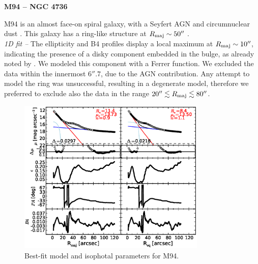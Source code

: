 \documentclass[preprint2]{emulateapj}
\newcommand{\fitfigurewidth}{0.8\textwidth}
\begin{document}
  \clearpage\newpage\noindent
  {\bf M94 -- NGC 4736 \\}

  M94 is an almost face-on spiral galaxy, with a Seyfert AGN \citep{veroncettyveron2006} and 
  circumnuclear dust \citep{elmegreen2002m94,peeplesmartini2006m94}.
  This galaxy has a ring-like structure at $R_{\rm maj} \sim 50''$ \citep{munoztunon1989m94}.\\

  \emph{1D fit -- }
  The ellipticity and B4 profiles display a local maximum at $R_{\rm maj} \sim 10''$, 
  indicating the presence of a disky component embedded in the bulge,
  as already noted by \cite{fisherdrory2010}.
  We modeled this component with a Ferrer function.
  We excluded the data within the innermost $6''.7$, due to the AGN contribution.
  Any attempt to model the ring was unsuccessful, resulting in a degenerate model, 
  therefore we preferred to exclude also the data in the range $20'' \lesssim R_{\rm maj} \lesssim 80''$.
  

  \begin{figure}[h]
  \begin{center}
  \includegraphics[width=\fitfigurewidth]{images/m94_1Dfit.eps}
  \caption{Best-fit model and isophotal parameters for M94.}
  \end{center}
  \end{figure}
\end{document}
